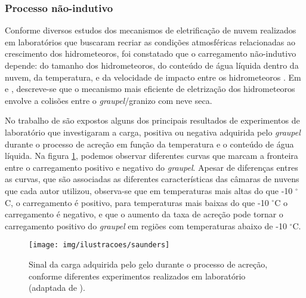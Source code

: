 \subsubsection{Processo não-indutivo}

Conforme diversos estudos dos mecanismos de eletrificação de nuvem realizados em laboratórios que buscaram recriar as condições atmosféricas relacionadas ao crescimento dos hidrometeoros, foi constatado que o carregamento não-indutivo depende: do tamanho dos hidrometeoros, do conteúdo de água líquida dentro da nuvem, da temperatura, e da velocidade de impacto entre os hidrometeoros  \cite{reynolds1957, Takahashi1978, baker1994, Saunders1999, pereyra2000}. Em  e , descreve-se que o mecanismo mais eficiente de eletrização dos hidrometeoros envolve a colisões entre o \textit{graupel}/granizo com neve seca. 

No trabalho de  são expostos alguns dos principais resultados de experimentos de laboratório que investigaram a carga, positiva ou negativa adquirida pelo \textit{graupel} durante o processo de acreção em função da temperatura e o conteúdo de água líquida. Na figura  \ref{fig:saunders}, podemos observar diferentes curvas que marcam a fronteira entre o carregamento positivo e negativo do \textit{graupel}. Apesar de diferenças entres as curvas, que são associadas as diferentes características das câmaras de nuvens que cada autor utilizou, observa-se que em temperaturas mais altas do que -10 $^{\circ}$C, o carregamento é positivo, para temperaturas mais baixas do que -10 $^{\circ}$C o carregamento é negativo, e que o aumento da taxa de acreção pode tornar o carregamento positivo do \textit{graupel} em regiões com temperaturas abaixo de -10 $^{\circ}$C.


\begin{figure}[htp]
\centering 
\texttt{[image: img/ilustracoes/saunders]}
\caption{Sinal da carga adquirida pelo gelo durante o processo de acreção, conforme diferentes experimentos realizados em laboratório (adaptada de ).}
\label{fig:saunders}
\end{figure}

